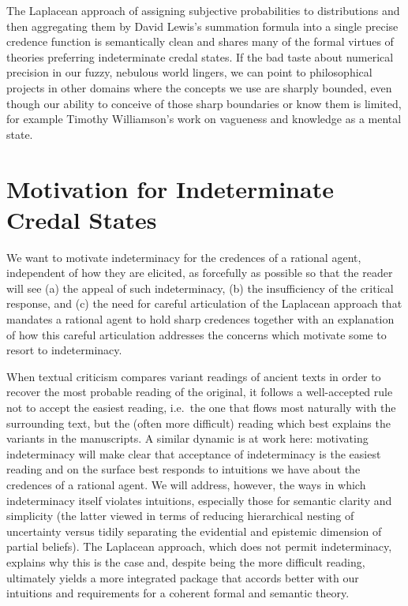 \documentclass[11pt]{article}
\begin{document}

The Laplacean approach of assigning subjective probabilities to
distributions and then aggregating them by David Lewis's summation
formula into a single precise credence function is semantically clean
and shares many of the formal virtues of theories preferring
indeterminate credal states. If the bad taste about numerical
precision in our fuzzy, nebulous world lingers, we can point to
philosophical projects in other domains where the concepts we use are
sharply bounded, even though our ability to conceive of those sharp
boundaries or know them is limited, for example Timothy Williamson's
work on vagueness and knowledge as a mental state.

\section{Motivation for Indeterminate Credal States} 
\label{MotivationForIndeterminateCredal States}

We want to motivate indeterminacy for the credences of a rational
agent, independent of how they are elicited, as forcefully as possible
so that the reader will see (a) the appeal of such indeterminacy, (b)
the insufficiency of the critical response, and (c) the need for
careful articulation of the Laplacean approach that mandates a
rational agent to hold sharp credences together with an explanation of
how this careful articulation addresses the concerns which motivate
some to resort to indeterminacy.

When textual criticism compares variant readings of ancient texts in
order to recover the most probable reading of the original, it follows
a well-accepted rule not to accept the easiest reading, i.e.\ the one
that flows most naturally with the surrounding text, but the (often
more difficult) reading which best explains the variants in the
manuscripts. A similar dynamic is at work here: motivating
indeterminacy will make clear that acceptance of indeterminacy is the
easiest reading and on the surface best responds to intuitions we have
about the credences of a rational agent. We will address, however, the
ways in which indeterminacy itself violates intuitions, especially
those for semantic clarity and simplicity (the latter viewed in terms
of reducing hierarchical nesting of uncertainty versus tidily
separating the evidential and epistemic dimension of partial beliefs).
The Laplacean approach, which does not permit indeterminacy, explains
why this is the case and, despite being the more difficult reading,
ultimately yields a more integrated package that accords better with
our intuitions and requirements for a coherent formal and semantic
theory.
\end{document}

